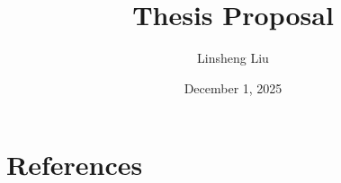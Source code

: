 \documentclass{article}
\theoremstyle{definition}
\begin{document}
\title{Thesis Proposal}
\author{Linsheng Liu}
\date{December 1, 2025\\
}
\maketitle


\ifdefined\pandoc\else
  \thispagestyle{firstpage}
\fi


\tableofcontents

\newpage






% 

%
%

% 
\ifdefined\pandoc
  \section{References}
\fi
{}

% 
% 
% 


% 
\end{document}
